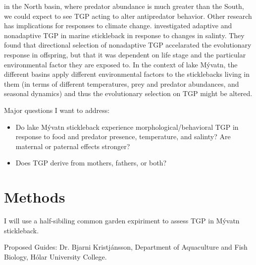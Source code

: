 \documentclass[12pt]{extarticle}
\begin{document}
in the North basin, where predator abundance is much greater than the South, we could expect to see TGP acting to alter antipredator behavior. Other research has implications for responses to climate change. \citet{Heckwolf2018} investigated adaptive and nonadaptive TGP in marine stickleback in response to changes in salinty. They found that directional selection of nonadaptive TGP accelarated the evolutionary response in offspring, but that it was dependent on life stage and the particular environmental factor they are exposed to. In the context of lake M\'yvatn, the different basins apply different environmental factors to the sticklebacks living in them (in terms of different temperatures, prey and predator abundances, and seasonal dynamics) and thus the evolutionary selection on TGP might be altered.   

Major questions I want to address:
\begin{itemize}
 \item Do lake M\'yvatn stickleback experience morphological/behavioral TGP in response to food and predator presence, temperature, and salinty? Are maternal or paternal effects stronger?
 \item Does TGP derive from mothers, fathers, or both?
\end{itemize}


\section{Methods}
I will use a half-sibiling common garden expiriment to assess TGP in M\'yvatn stickleback.

Proposed Guides: Dr. Bjarni Kristj\'ansson, Department of Aquaculture and Fish Biology, H\'olar University College.

\end{document}
